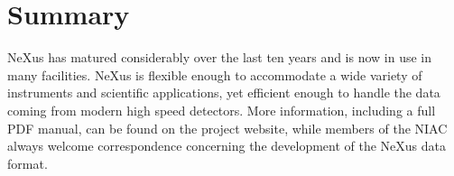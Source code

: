 \documentclass[%
 aip,
rsi,
 amsmath,amssymb,
 reprint,%
]{revtex4-1}
\begin{document}
\section{Summary}

NeXus has matured considerably over the last ten years and is now in use in many facilities. NeXus 
is flexible enough to accommodate a wide variety of instruments and scientific applications,
yet efficient enough to handle the data coming from modern high speed detectors.
More information, including a full PDF manual, can be found on the project 
website\cite{nxwww}, while members of the NIAC\cite{niac}
always welcome correspondence concerning the development of the NeXus data format.


\nocite{*}
\end{document}
